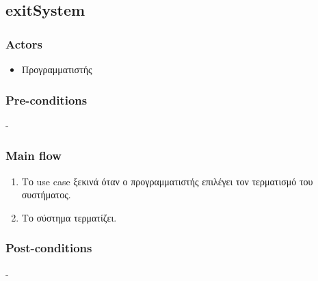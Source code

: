 \documentclass[../diploma_thesis.tex]{subfiles}
\begin{document}
\subsection{exitSystem}
\subsubsection{Actors}
\begin{itemize}
\item  Προγραμματιστής
\end{itemize}
\subsubsection{Pre-conditions}
-
\subsubsection{Main flow}
\begin{enumerate}
\item Το use case ξεκινά όταν ο προγραμματιστής επιλέγει τον τερματισμό του συστήματος.
\item Το σύστημα τερματίζει.
\end{enumerate}
\subsubsection{Post-conditions}
-
\end{document}
